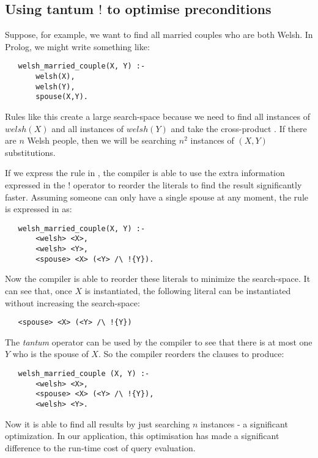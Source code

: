 \subsection{Using tantum $!$  to optimise preconditions}
\label{optimizingpreconditions}
Suppose, for example, we want to find all married couples who are both Welsh.
In Prolog, we might write something like:
\begin{verbatim}
   welsh_married_couple(X, Y) :-
       welsh(X),
       welsh(Y),
       spouse(X,Y).
\end{verbatim}	
Rules like this create a large search-space because we need to find all instances of $welsh(X)$ and all instances of  $welsh(Y)$ and take the cross-product \cite{smith-and-genesereth}. If there are $n$ Welsh people, then we will be searching $n^2$ instances of $(X,Y)$ substitutions.

If we express the rule in \cathoristic{}, the compiler is able to use the extra information expressed in the $!$ operator to reorder the literals to find the result significantly faster.
Assuming someone can only have a single spouse at any moment, the rule is expressed in \cathoristic{} as:
\begin{verbatim}
   welsh_married_couple(X, Y) :-
       <welsh> <X>,
       <welsh> <Y>,
       <spouse> <X> (<Y> /\ !{Y}).
\end{verbatim}	
Now the compiler is able to reorder these literals to minimize the search-space. 
It can see that, once $X$ is instantiated, the following literal can be instantiated without increasing the search-space:
\begin{verbatim}
   <spouse> <X> (<Y> /\ !{Y})
\end{verbatim}
The \emph{tantum} operator can be used by the compiler to see that there is at most one $Y$ who is the spouse of $X$.
So the compiler reorders the clauses to produce:
\begin{verbatim}
   welsh_married_couple (X, Y) :-
       <welsh> <X>,
       <spouse> <X> (<Y> /\ !{Y}),
       <welsh> <Y>.
\end{verbatim}	
Now it is able to find all results by just searching $n$ instances - a significant optimization.
In our application, this optimisation has made a significant difference to the run-time cost of query evaluation.






